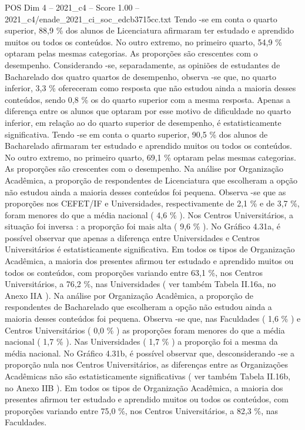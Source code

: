\begin{textsample}{POS Dim 4 – 2021\_c4 – Score 1.00 – 2021\_c4/enade\_2021\_ci\_soc\_edcb3715cc.txt}
Tendo -se em conta o quarto superior, 88,9 \% dos alunos de Licenciatura afirmaram ter estudado e aprendido muitos ou todos os conteúdos.
No outro extremo, no primeiro quarto, 54,9 \% optaram pelas mesmas categorias.
As proporções são crescentes com o desempenho.
Considerando -se, separadamente, as opiniões de estudantes de Bacharelado dos quatro quartos de desempenho, observa -se que, no quarto inferior, 3,3 \% ofereceram como resposta que não estudou ainda a maioria desses conteúdos, sendo 0,8 \% os do quarto superior com a mesma resposta.
Apenas a diferença entre os alunos que optaram por esse motivo de dificuldade no quarto inferior, em relação ao do quarto superior de desempenho, é estatisticamente significativa.
Tendo -se em conta o quarto superior, 90,5 \% dos alunos de Bacharelado afirmaram ter estudado e aprendido muitos ou todos os conteúdos.
No outro extremo, no primeiro quarto, 69,1 \% optaram pelas mesmas categorias.
As proporções são crescentes com o desempenho.
Na análise por Organização Acadêmica, a proporção de respondentes de Licenciatura que escolheram a opção não estudou ainda a maioria desses conteúdos foi pequena.
Observa -se que as proporções nos CEFET/IF e Universidades, respectivamente de 2,1 \% e de 3,7 \%, foram menores do que a média nacional ( 4,6 \% ).
Nos Centros Universitários, a situação foi inversa : a proporção foi mais alta ( 9,6 \% ).
No Gráfico 4.31a, é possível observar que apenas a diferença entre Universidades e Centros Universitários é estatisticamente significativa.
Em todos os tipos de Organização Acadêmica, a maioria dos presentes afirmou ter estudado e aprendido muitos ou todos os conteúdos, com proporções variando entre 63,1 \%, nos Centros Universitários, a 76,2 \%, nas Universidades ( ver também Tabela II.16a, no Anexo IIA ).
Na análise por Organização Acadêmica, a proporção de respondentes de Bacharelado que escolheram a opção não estudou ainda a maioria desses conteúdos foi pequena.
Observa -se que, nas Faculdades ( 1,6 \% ) e Centros Universitários ( 0,0 \% ) as proporções foram menores do que a média nacional ( 1,7 \% ).
Nas Universidades ( 1,7 \% ) a proporção foi a mesma da média nacional.
No Gráfico 4.31b, é possível observar que, desconsiderando -se a proporção nula nos Centros Universitários, as diferenças entre as Organizações Acadêmicas não são estatisticamente significativas ( ver também Tabela II.16b, no Anexo IIB ).
Em todos os tipos de Organização Acadêmica, a maioria dos presentes afirmou ter estudado e aprendido muitos ou todos os conteúdos, com proporções variando entre 75,0 \%, nos Centros Universitários, a 82,3 \%, nas Faculdades.

\end{textsample}
